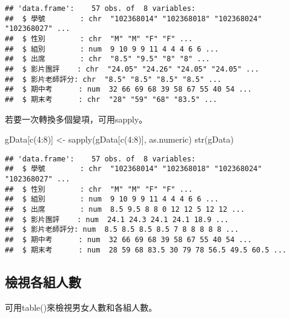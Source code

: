 \documentclass[
]{book}
\newenvironment{Shaded}{\begin{snugshade}}{\end{snugshade}}
\newcommand{\DecValTok}[1]{\textcolor[rgb]{0.00,0.00,0.81}{#1}}
\newcommand{\FunctionTok}[1]{\textcolor[rgb]{0.00,0.00,0.00}{#1}}
\newcommand{\NormalTok}[1]{#1}
\newcommand{\OtherTok}[1]{\textcolor[rgb]{0.56,0.35,0.01}{#1}}
\newcommand{\SpecialCharTok}[1]{\textcolor[rgb]{0.00,0.00,0.00}{#1}}
\begin{document}
\begin{verbatim}
## 'data.frame':    57 obs. of  8 variables:
##  $ 學號        : chr  "102368014" "102368018" "102368024" "102368027" ...
##  $ 性別        : chr  "M" "M" "F" "F" ...
##  $ 組別        : num  9 10 9 9 11 4 4 4 6 6 ...
##  $ 出席        : chr  "8.5" "9.5" "8" "8" ...
##  $ 影片團評    : chr  "24.05" "24.26" "24.05" "24.05" ...
##  $ 影片老師評分: chr  "8.5" "8.5" "8.5" "8.5" ...
##  $ 期中考      : num  32 66 69 68 39 58 67 55 40 54 ...
##  $ 期末考      : chr  "28" "59" "68" "83.5" ...
\end{verbatim}

若要一次轉換多個變項，可用sapply。

\begin{Shaded}
\begin{Highlighting}[]
\NormalTok{gData[}\FunctionTok{c}\NormalTok{(}\DecValTok{4}\SpecialCharTok{:}\DecValTok{8}\NormalTok{)] }\OtherTok{\textless{}{-}} \FunctionTok{sapply}\NormalTok{(gData[}\FunctionTok{c}\NormalTok{(}\DecValTok{4}\SpecialCharTok{:}\DecValTok{8}\NormalTok{)], as.numeric)}
\FunctionTok{str}\NormalTok{(gData)}
\end{Highlighting}
\end{Shaded}

\begin{verbatim}
## 'data.frame':    57 obs. of  8 variables:
##  $ 學號        : chr  "102368014" "102368018" "102368024" "102368027" ...
##  $ 性別        : chr  "M" "M" "F" "F" ...
##  $ 組別        : num  9 10 9 9 11 4 4 4 6 6 ...
##  $ 出席        : num  8.5 9.5 8 8 0 12 12 5 12 12 ...
##  $ 影片團評    : num  24.1 24.3 24.1 24.1 18.9 ...
##  $ 影片老師評分: num  8.5 8.5 8.5 8.5 7 8 8 8 8 8 ...
##  $ 期中考      : num  32 66 69 68 39 58 67 55 40 54 ...
##  $ 期末考      : num  28 59 68 83.5 30 79 78 56.5 49.5 60.5 ...
\end{verbatim}

\hypertarget{ux6aa2ux8996ux5404ux7d44ux4ebaux6578}{%
\subsection{檢視各組人數}\label{ux6aa2ux8996ux5404ux7d44ux4ebaux6578}}

可用table()來檢視男女人數和各組人數。

\begin{Shaded}
\end{Shaded}
\end{document}

